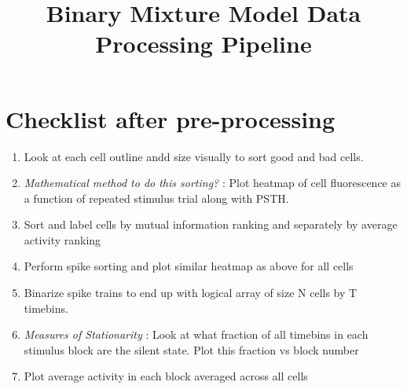 \documentclass[10pt,letterpaper]{article}
\begin{document}
	\title{Binary Mixture Model Data Processing Pipeline}
	\maketitle
	\section{Checklist after pre-processing}
	
	\begin{enumerate}
		\item Look at each cell outline andd size visually to sort good and bad cells.
		\item \textit{Mathematical method to do this sorting?} : Plot heatmap of cell fluorescence as a function of repeated stimulus trial along with PSTH. 
		\item Sort and label cells by mutual information ranking and separately by average activity ranking
		\item Perform spike sorting and plot similar heatmap as above for all cells
		\item Binarize spike trains to end up with logical array of size N cells by T timebins.
		\item \textit{Measures of Stationarity} : Look at what fraction of all timebins in each stimulus block are the silent state. Plot this fraction vs block number
		\item Plot average activity in each block averaged across all cells 
	
	\end{enumerate}
	
\end{document}
